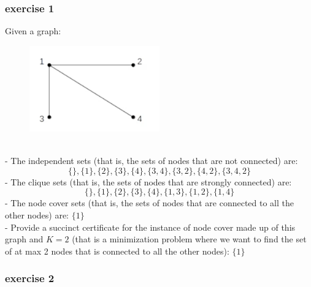 \documentclass[12pt]{article}
\begin{document}
\subsubsection{exercise 1}
Given a graph:
\begin{figure}[h]
  \centering
  \includegraphics[width=0.5\textwidth]{img/es1.png}
\end{figure}
\\
- The independent sets (that is, the sets of nodes that are not connected) are: $$\{\}, \{1\}, \{2\}, \{3\}, \{4\}, \{3,4\}, \{3,2\}, \{4,2\}, \{3,4,2\}$$
- The clique sets (that is, the sets of nodes that are strongly connected) are: 
$$ \{\}, \{1\}, \{2\}, \{3\}, \{4\}, \{1,3\}, \{1,2\}, \{1,4\} $$
- The node cover sets (that is, the sets of nodes that are connected to all the other nodes) are:
$\{1\}$\\
- Provide a succinct certificate for the instance of node cover made up of this graph and $K=2$ (that is a minimization problem where we want to find the set of at max 2 nodes that is connected to all the other nodes):
$\{1\}$
\subsubsection{exercise 2}
\end{document}
